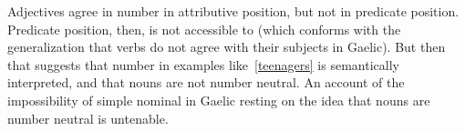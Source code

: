 \documentclass[output=paper]{langsci/langscibook}
\begin{document}
\ea {} \label{number}
    \z
\z
Adjectives agree in number in attributive position, but not in
predicate position. Predicate position, then, is not accessible to 
(which conforms with the generalization that verbs do not agree with their
subjects in Gaelic). But then that suggests that number in examples
like~\eqref{teenagers} is semantically interpreted, and that nouns are not number
neutral. An account of the impossibility of simple nominal  in Gaelic resting on the idea that nouns are number neutral is untenable.

%
%
%

%
\end{document}

